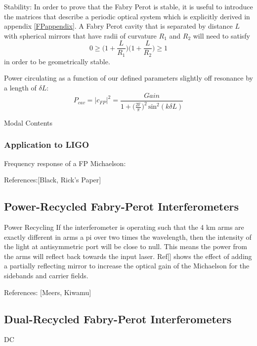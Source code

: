 \documentclass[oneside]{book}
\begin{document}
		Stability: In order to prove that the Fabry Perot is stable, it is useful to introduce the matrices that describe a periodic optical system which is explicitly derived in appendix \ref{FPappendix}.  A Fabry Perot cavity that is separated by distance $L$ with spherical mirrors that have radii of curvature $R_1$ and $R_2$ will need to satisfy 
		\begin{equation}\label{gfactor}
		0 \geq \bigg(1+\frac{L}{R_1}\bigg) \bigg(1+\frac{L}{R_2}\bigg) \geq 1
		\end{equation}
		in order to be geometrically stable.
		
		Power circulating as a function of our defined parameters slightly off resonance by a length of $\delta L$:
		\begin{equation}
		P_{cav} = \vert c_{FP} \vert^2 = \frac{Gain}{ 1 + \big(\frac{2\mathbb{F}}{\pi} \big)^2 \, \text{sin}^2(k \delta L) }
		\end{equation}
		
		Modal Contents
		
		\subsubsection{Application to LIGO}
		
		Frequency response of a FP Michaelson:

		References:[Black, Rick's Paper]

		\subsection{Power-Recycled Fabry-Perot Interferometers}
		Power Recycling
		If the interferometer is operating such that the 4 km arms are exactly different in arms a pi over two times the wavelength, then the intensity of the light at antisymmetric port will be close to null.  This means the power from the arms will reflect back towards the input laser.  Ref[] shows the effect of adding a partially reflecting mirror to increase the optical gain of the Michaelson for the sidebands and carrier fields.
		
		
		
		References: [Meers, Kiwamu]
		
		\subsection{Dual-Recycled Fabry-Perot Interferometers}
		
		DC
		
\end{document}
